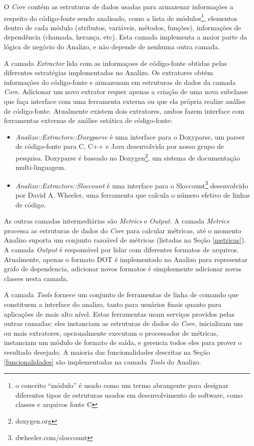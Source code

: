 \documentclass{article}
\begin{document}
O {\it Core} contém as estruturas de dados usadas para armazenar informações a
respeito do código-fonte sendo analisado, como a lista de módulos\footnote{o
conceito ``módulo'' é usado como um termo abrangente para designar diferentes
tipos de estruturas usados em desenvolvimento de software, como classes e
arquivos fonte C}, elementos dentro de cada módulo (atributos, variáveis,
métodos, funções), informações de dependência (chamada, herança, etc). Esta
camada implementa a maior parte da lógica de negócio do Analizo, e não depende
de nenhuma outra camada.

A camada {\it Extractor} lida com as informaçoes de código-fonte obtidas pelas
diferentes estratégias implementadas no Analizo. Os extratores obtém
informações do código-fonte e armazenam em estruturas de dados da camada {\it
Core}. Adicionar um novo extrator requer apenas a criação de uma nova subclasse
que faça interface com uma ferramenta externa ou que ela própria realize análise
de código-fonte. Atualmente existem dois extratores, ambos fazem interface
com ferramentas externas de análise estática de código-fonte:

\begin{itemize}

  \item {\it Analizo::Extractors::Doxyparse} é uma interface para o Doxyparse,
  um parser de código-fonte para C, C++ e Java desenvolvida por nosso grupo de
  pesquisa\cite{Costa2009}. Doxyparse é baseado no
  Doxygen\footnote{doxygen.org}, um sistema de documentação multi-linguagem.

  \item {\it Analizo::Extractors::Sloccount} é uma interface para o
  Sloccount\footnote{dwheeler.com/sloccount} desenvolvido por David A. Wheeler,
  uma ferramenta que calcula o número efetivo de linhas de código.

\end{itemize}

As outras camadas intermediárias são {\it Metrics} e {\it Output}. A camada
{\it Metrics} processa as estruturas de dados do {\it Core} para calcular
métricas, até o momento Analizo suporta um conjunto razoável de métricas
(listadas na Seção \ref{metricas}). A camada {\it Output} é responsável por
lidar com diferentes formatos de arquivos. Atualmente, apenas o formato DOT é
implementado no Analizo para representar grafo de dependencia, adicionar novos
formatos é simplesmente adicionar novas classes nesta camada.

A camada {\it Tools} fornece um conjunto de ferramentas de linha de comando que
constituem a interface do analizo, tanto para usuários finais quanto para
aplicações de mais alto nível. Estas ferramentas usam serviços providos pelas
outras camadas: eles instanciam as estruturas de dados do {\it Core},
inicializam um ou mais extratores, opcionalmente executam o processador de
métricas, instanciam um módulo de formato de saída, e gerencia todos eles para
prover o resultado desejado. A maioria das funcionalidades descritas na Seção
\ref{funcionalidades} são implementadas na camada {\it Tools} do Analizo.
\end{document}
